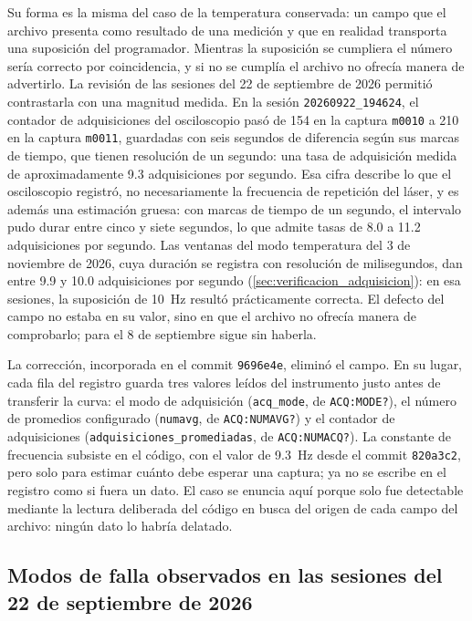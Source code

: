 Su forma es la misma del caso de la temperatura conservada: un campo
que el archivo presenta como resultado de una medición y que en
realidad transporta una suposición del programador. Mientras la
suposición se cumpliera el número sería correcto por coincidencia, y si
no se cumplía el archivo no ofrecía manera de advertirlo. La revisión
de las sesiones del 22 de septiembre de 2026 permitió contrastarla con
una magnitud medida. En la sesión \texttt{20260922\_194624}, el
contador de adquisiciones del osciloscopio pasó de 154 en la captura
\texttt{m0010} a 210 en la captura \texttt{m0011}, guardadas con seis
segundos de diferencia según sus marcas de tiempo, que tienen
resolución de un segundo: una tasa de adquisición medida de
aproximadamente 9.3 adquisiciones por segundo. Esa cifra describe lo
que el osciloscopio registró, no necesariamente la frecuencia de
repetición del láser, y es además una estimación gruesa: con marcas de
tiempo de un segundo, el intervalo pudo durar entre cinco y siete
segundos, lo que admite tasas de 8.0 a 11.2 adquisiciones por segundo.
Las ventanas del modo temperatura del 3 de noviembre de 2026, cuya
duración se registra con resolución de milisegundos, dan entre 9.9 y
10.0 adquisiciones por segundo (\cref{sec:verificacion_adquisicion}): en esa
sesiones, la suposición de \SI{10}{\hertz} resultó prácticamente
correcta. El defecto del campo no estaba en su valor, sino en que el
archivo no ofrecía manera de comprobarlo; para el 8 de septiembre sigue
sin haberla.

La corrección, incorporada en el commit \texttt{9696e4e}, eliminó el
campo. En su lugar, cada fila del registro guarda tres valores leídos
del instrumento justo antes de transferir la curva: el modo de
adquisición (\texttt{acq\_mode}, de \texttt{ACQ:MODE?}), el número de
promedios configurado (\texttt{numavg}, de \texttt{ACQ:NUMAVG?}) y el
contador de adquisiciones (\texttt{adquisiciones\_promediadas}, de
\texttt{ACQ:NUMACQ?}). La constante de frecuencia subsiste en el código,
con el valor de \SI{9.3}{\hertz} desde el commit \texttt{820a3c2}, pero
solo para estimar cuánto debe esperar una captura; ya no se escribe en
el registro como si fuera un dato. El caso se enuncia aquí porque solo
fue detectable mediante la lectura deliberada del código en busca del
origen de cada campo del archivo: ningún dato lo habría delatado.

\subsection{Modos de falla observados en las sesiones del 22 de
septiembre de 2026}
\label{sec:fallas_22sep}

